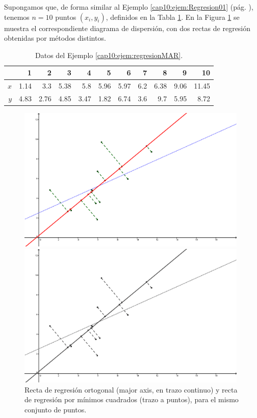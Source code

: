\begin{ejemplo}
\label{cap10:ejem:regresionMAR}
Supongamos que, de forma similar al Ejemplo \ref{cap10:ejem:Regresion01} (pág. \pageref{cap10:ejem:Regresion01}),  tenemos $n=10$ puntos $(x_i,y_i)$, definidos en la Tabla \ref{cap10:tabla:EjemploRegresionMAR}. En la Figura \ref{cap10:fig:RegresionMAR} se muestra el correspondiente diagrama de dispersión, con dos rectas de regresión obtenidas por métodos distintos.
\begin{table}[ht]
\centering
\begin{tabular}{rrrrrrrrrrr}
  \hline
 & 1 & 2 & 3 & 4 & 5 & 6 & 7 & 8 & 9 & 10 \\
  \hline
$x$ & 1.14& 3.3& 5.38& 5.8& 5.96& 5.97& 6.2& 6.38& 9.06& 11.45 \\
$y$ & 4.83& 2.76& 4.85& 3.47& 1.82& 6.74& 3.6& 9.7& 5.95& 8.72 \\
   \hline
\end{tabular}
\caption{Datos del Ejemplo \ref{cap10:ejem:regresionMAR}.}
\label{cap10:tabla:EjemploRegresionMAR}
\end{table}

\begin{figure}[htbp]
\begin{center}
\begin{enColor}
\includegraphics[width=11cm]{../fig/Cap10-Regresion-MAR.png}
\end{enColor}
\begin{bn}
\includegraphics[width=11cm]{../fig/Cap10-Regresion-MAR-bn.png}
\end{bn}
\caption{Recta de regresión ortogonal (major axis, en trazo continuo) y recta de regresión por mínimos cuadrados (trazo a puntos), para el mismo conjunto de puntos.}
\label{cap10:fig:RegresionMAR}
\end{center}
\end{figure}


\end{ejemplo}
